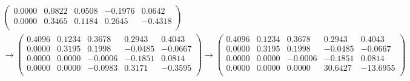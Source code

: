 \documentclass{sjtuarticle}
\begin{document}
\begin{itemize}
\begin{solution}
\begin{itemize}
\begin{align*}
\begin{pmatrix}
                0.0000 &       0.0822 &       0.0508 &      -0.1976 &        0.0642\\
                0.0000 &       0.3465 &       0.1184 &       0.2645 &       -0.4318\\
            \end{pmatrix} \\
            \rightarrow\begin{pmatrix}
            0.4096 &       0.1234 &       0.3678 &       0.2943 &        0.4043\\
            0.0000 &       0.3195 &       0.1998 &      -0.0485 &       -0.0667\\
            0.0000 &       0.0000 &      -0.0006 &      -0.1851 &        0.0814\\
            0.0000 &       0.0000 &      -0.0983 &       0.3171 &       -0.3595\\
            \end{pmatrix}\rightarrow
            \begin{pmatrix}
            0.4096 &       0.1234 &       0.3678 &       0.2943 &        0.4043\\
            0.0000 &       0.3195 &       0.1998 &      -0.0485 &       -0.0667\\
            0.0000 &       0.0000 &      -0.0006 &      -0.1851 &        0.0814\\
            0.0000 &       0.0000 &       0.0000 &      30.6427 &      -13.6955\\
            \end{pmatrix}
        \end{align*}


\end{itemize}
\end{solution}
\end{itemize}
\end{document}
